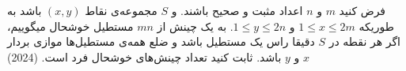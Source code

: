 فرض کنید $m$ و $n$ اعداد مثبت و صحیح باشند. و $S$ ‌مجموعه‌ی نقاط $(x, y)$ باشد به طوریکه
$1 \le x \le 2m$ و $1 \le y \le 2n$. به یک چینش از $mn$ مستطیل خوشحال میگوییم، اگر هر نقطه در $S$ دقیقا
راس یک مستطیل باشد و ضلع همه‌ی مستطیل‌ها موازی بردار $x$ و $y$ باشد.
ثابت کنید تعداد چینش‌های خوشحال فرد است.
(2024)